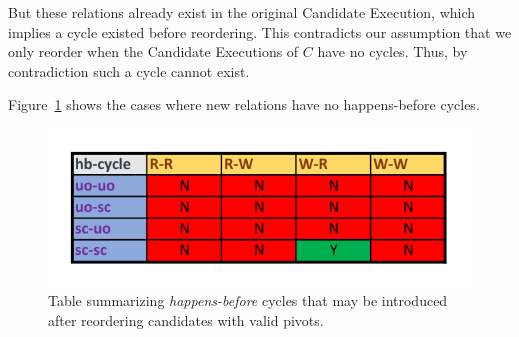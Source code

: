     But these relations already exist in the original Candidate Execution, which implies a cycle existed before reordering. 
    This contradicts our assumption that we only reorder when the Candidate Executions of $C$ have no cycles. 
    Thus, by contradiction such a cycle cannot exist.

    Figure~\ref{reord:cycle_table} shows the cases where new relations have no happens-before cycles. 
    \begin{figure}[H]
        \centering
        \includegraphics[scale=0.7]{4.InstructionReordering/4.ValidReorderingCandidate/ProofParts/Part3/part3_table.pdf}
        \caption{Table summarizing \textit{happens-before} cycles that may be introduced after reordering candidates with valid pivots.}
        \label{reord:cycle_table}
    \end{figure}